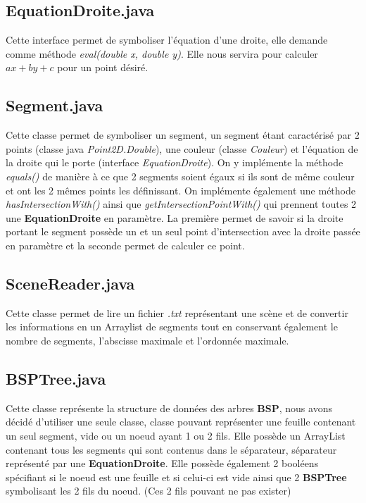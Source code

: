 \documentclass{article}
\begin{document}
\subsection{EquationDroite.java}

Cette interface permet de symboliser l'équation d'une droite, elle demande comme méthode 
\textit{eval(double x, double y)}. Elle nous servira pour calculer $ax+by+c$ pour un point désiré.

\subsection{Segment.java}

Cette classe permet de symboliser un segment, un segment étant caractérisé par 2 points 
(classe java \textit{Point2D.Double}), une couleur (classe \textit{Couleur}) et l'équation de la 
droite qui le porte (interface \textit{EquationDroite}). On y implémente la méthode 
\textit{equals()} de manière à ce que 2 segments soient égaux si ils sont de même couleur et ont les 
2 mêmes points les définissant. On implémente également une méthode \textit{hasIntersectionWith()} 
ainsi que \textit{getIntersectionPointWith()} qui prennent toutes 2 une \textbf{EquationDroite} en 
paramètre. La première permet de savoir si la droite portant le segment possède un et un seul point 
d'intersection avec la droite passée en paramètre et la seconde permet de calculer ce point.

\subsection{SceneReader.java}

Cette classe permet de lire un fichier \textit{.txt} représentant une scène et de convertir les 
informations en un Arraylist de segments tout en conservant également le nombre de segments, 
l'abscisse maximale et l'ordonnée maximale.

\subsection{BSPTree.java}

Cette classe représente la structure de données des arbres \textbf{BSP}, nous avons décidé 
d'utiliser une seule classe, classe pouvant représenter une feuille contenant un seul segment, vide 
ou un noeud ayant 1 ou 2 fils. Elle possède un ArrayList contenant tous les segments qui sont 
contenus dans le séparateur, séparateur représenté par une \textbf{EquationDroite}. Elle possède 
également 2 booléens spécifiant si le noeud est une feuille et si celui-ci est vide ainsi que 2 
\textbf{BSPTree} symbolisant les 2 fils du noeud. (Ces 2 fils pouvant ne pas exister)
\end{document}
